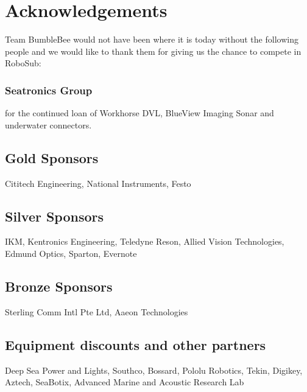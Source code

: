 \documentclass[journal,12pt]{IEEEtran}
\begin{document}
\section*{Acknowledgements}
Team BumbleBee would not have been where it is today without the following people and we would like to thank them for giving us the chance to compete in RoboSub:


\subsubsection*{Seatronics Group} for the continued loan of Workhorse DVL, BlueView Imaging Sonar and underwater connectors.

\subsection*{Gold Sponsors} 
Cititech Engineering, National Instruments, Festo

\subsection*{Silver Sponsors} 
IKM, Kentronics Engineering, Teledyne Reson, Allied Vision Technologies, Edmund Optics, Sparton, Evernote

\subsection*{Bronze Sponsors}
Sterling Comm Intl Pte Ltd, Aaeon Technologies 

\subsection*{Equipment discounts and other partners} 
Deep Sea Power and Lights, Southco, Bossard, Pololu Robotics, Tekin, Digikey, Aztech, SeaBotix, Advanced Marine and Acoustic Research Lab
\end{document}
